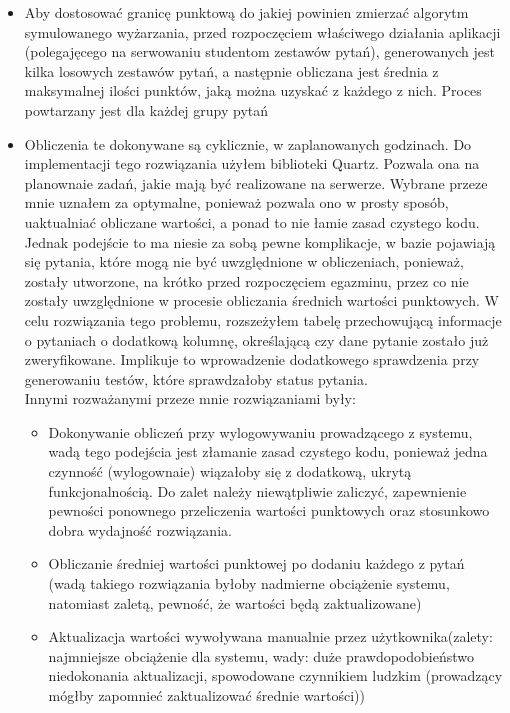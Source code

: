\documentclass[a4paper, titlepage]{article}
\begin{document}
	\begin{itemize}
	\item Aby dostosować granicę punktową do jakiej powinien zmierzać algorytm symulowanego wyżarzania, przed rozpoczęciem właściwego działania aplikacji (polegajęcego na serwowaniu studentom zestawów pytań), generowanych jest kilka losowych zestawów pytań, a następnie obliczana jest średnia z maksymalnej ilości punktów, jaką można uzyskać z każdego z nich. Proces powtarzany jest dla każdej grupy pytań
	\item Obliczenia te dokonywane są cyklicznie, w zaplanowanych godzinach. Do implementacji tego rozwiązania użyłem biblioteki Quartz. Pozwala ona na planownaie zadań, jakie mają być realizowane na serwerze. Wybrane przeze mnie uznałem za optymalne, ponieważ pozwala ono w prosty sposób, uaktualniać obliczane wartości, a ponad to nie łamie zasad czystego kodu. Jednak podejście to ma niesie za sobą pewne komplikacje, w bazie pojawiają się pytania, które mogą nie być uwzględnione w obliczeniach, ponieważ, zostały utworzone, na krótko przed rozpoczęciem egazminu, przez co nie zostały uwzględnione w procesie obliczania średnich wartości punktowych. W celu rozwiązania tego problemu, rozszeżyłem tabelę przechowującą informacje o pytaniach o dodatkową kolumnę, określającą czy dane pytanie zostało już zweryfikowane. Implikuje to wprowadzenie dodatkowego sprawdzenia przy generowaniu testów, które sprawdzałoby status pytania. 
\\Innymi rozważanymi przeze mnie rozwiązaniami były:
		\begin{itemize}
        \item Dokonywanie obliczeń przy wylogowywaniu prowadzącego z systemu, wadą tego podejścia jest złamanie zasad czystego kodu, ponieważ jedna czynność (wylogownaie) wiązałoby się z dodatkową, ukrytą funkcjonalnością. Do zalet należy niewątpliwie zaliczyć, zapewnienie pewności ponownego przeliczenia wartości punktowych oraz stosunkowo dobra wydajność rozwiązania. 
		\item Obliczanie średniej wartości punktowej po dodaniu każdego z pytań (wadą takiego rozwiązania byłoby nadmierne obciążenie systemu, natomiast zaletą, pewność, że wartości będą zaktualizowane)
		\item Aktualizacja wartości wywoływana manualnie przez użytkownika(zalety: najmniejsze obciążenie dla systemu, wady: duże prawdopodobieństwo niedokonania aktualizacji, spowodowane czynnikiem ludzkim (prowadzący mógłby zapomnieć zaktualizować średnie wartości))
		\end{itemize}

\end{itemize}
\end{document}
